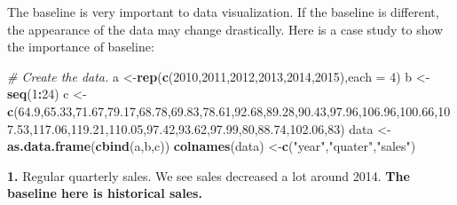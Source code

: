 \documentclass[]{book}
\newenvironment{Shaded}{\begin{snugshade}}{\end{snugshade}}
\newcommand{\KeywordTok}[1]{\textcolor[rgb]{0.13,0.29,0.53}{\textbf{#1}}}
\newcommand{\DataTypeTok}[1]{\textcolor[rgb]{0.13,0.29,0.53}{#1}}
\newcommand{\DecValTok}[1]{\textcolor[rgb]{0.00,0.00,0.81}{#1}}
\newcommand{\FloatTok}[1]{\textcolor[rgb]{0.00,0.00,0.81}{#1}}
\newcommand{\StringTok}[1]{\textcolor[rgb]{0.31,0.60,0.02}{#1}}
\newcommand{\CommentTok}[1]{\textcolor[rgb]{0.56,0.35,0.01}{\textit{#1}}}
\newcommand{\OperatorTok}[1]{\textcolor[rgb]{0.81,0.36,0.00}{\textbf{#1}}}
\newcommand{\NormalTok}[1]{#1}
\theoremstyle{definition}
\theoremstyle{definition}
\theoremstyle{definition}
\theoremstyle{remark}
\begin{document}
The baseline is very important to data visualization. If the baseline is
different, the appearance of the data may change drastically. Here is a
case study to show the importance of baseline:

\begin{Shaded}
\begin{Highlighting}[]
\CommentTok{# Create the data.}
\NormalTok{a <-}\KeywordTok{rep}\NormalTok{(}\KeywordTok{c}\NormalTok{(}\DecValTok{2010}\NormalTok{,}\DecValTok{2011}\NormalTok{,}\DecValTok{2012}\NormalTok{,}\DecValTok{2013}\NormalTok{,}\DecValTok{2014}\NormalTok{,}\DecValTok{2015}\NormalTok{),}\DataTypeTok{each =} \DecValTok{4}\NormalTok{)}
\NormalTok{b <-}\StringTok{ }\KeywordTok{seq}\NormalTok{(}\DecValTok{1}\OperatorTok{:}\DecValTok{24}\NormalTok{)}
\NormalTok{c <-}\StringTok{ }\KeywordTok{c}\NormalTok{(}\FloatTok{64.9}\NormalTok{,}\FloatTok{65.33}\NormalTok{,}\FloatTok{71.67}\NormalTok{,}\FloatTok{79.17}\NormalTok{,}\FloatTok{68.78}\NormalTok{,}\FloatTok{69.83}\NormalTok{,}\FloatTok{78.61}\NormalTok{,}\FloatTok{92.68}\NormalTok{,}\FloatTok{89.28}\NormalTok{,}\FloatTok{90.43}\NormalTok{,}\FloatTok{97.96}\NormalTok{,}\FloatTok{106.96}\NormalTok{,}\FloatTok{100.66}\NormalTok{,}\FloatTok{107.53}\NormalTok{,}\FloatTok{117.06}\NormalTok{,}\FloatTok{119.21}\NormalTok{,}\FloatTok{110.05}\NormalTok{,}\FloatTok{97.42}\NormalTok{,}\FloatTok{93.62}\NormalTok{,}\FloatTok{97.99}\NormalTok{,}\DecValTok{80}\NormalTok{,}\FloatTok{88.74}\NormalTok{,}\FloatTok{102.06}\NormalTok{,}\DecValTok{83}\NormalTok{)}
\NormalTok{data <-}\StringTok{ }\KeywordTok{as.data.frame}\NormalTok{(}\KeywordTok{cbind}\NormalTok{(a,b,c))}
\KeywordTok{colnames}\NormalTok{(data) <-}\KeywordTok{c}\NormalTok{(}\StringTok{"year"}\NormalTok{,}\StringTok{"quater"}\NormalTok{,}\StringTok{"sales"}\NormalTok{)}
\end{Highlighting}
\end{Shaded}

\textbf{1.} Regular quarterly sales. We see sales decreased a lot around
2014. \textbf{The baseline here is historical sales.}

\begin{Shaded}
\end{Shaded}
\end{document}
